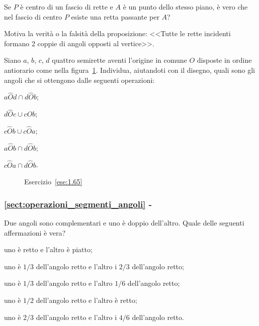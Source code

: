 \begin{esercizio}
\label{ese:1.63}
Se \(P\) è centro di un fascio di rette e \(A\) è un punto dello stesso 
piano, è vero che nel fascio di centro \(P\) esiste una retta passante 
per \(A\)?
\end{esercizio}

\begin{esercizio}
\label{ese:1.64}
Motiva la verità o la falsità della proposizione: <<Tutte le rette 
incidenti formano 2 coppie di angoli opposti al vertice>>.
\end{esercizio}

\begin{esercizio}
\label{ese:1.65}
Siano \(a\), \(b\), \(c\), \(d\) quattro semirette aventi l'origine in comune 
\(O\) disposte in ordine antiorario come nella 
figura~\ref{fig:ese1.65}. Individua, aiutandoti con il disegno, quali 
sono gli angoli che si ottengono dalle seguenti operazioni:
\begin{multicols}{3}
\begin{enumeratea}
\item \(a\widehat{O}d \cap d\widehat{O}b\);
\item \(d\widehat{O}c \cup c\widehat{O}b\);
\item \(c\widehat{O}b \cup c\widehat{O}a\);
\item \(a\widehat{O}b \cap d\widehat{O}b\);
\item \(c\widehat{O}a \cap d\widehat{O}b\).
\end{enumeratea}
\end{multicols}
\end{esercizio}


\begin{inaccessibleblock}
 \begin{figure}[htb]
 \centering
 \caption{Esercizio~\ref{ese:1.65}}\label{fig:ese1.65}
\end{figure}
\end{inaccessibleblock}

\begingroup
\hypersetup{linkcolor=black}
\subsubsection*{\ref{sect:operazioni_segmenti_angoli} - 
}
\endgroup

\begin{esercizio}
\label{ese:1.66}
Due angoli sono complementari e uno è doppio dell'altro. Quale delle 
seguenti affermazioni è vera?
\begin{enumeratea}
\item uno è retto e l'altro è piatto;
\item uno è \(1/3\) dell'angolo retto e l'altro i \(2/3\) dell'angolo 
retto;
\item uno è \(1/3\) dell'angolo retto e l'altro \(1/6\) dell'angolo retto;
\item uno è \(1/2\) dell'angolo retto e l'altro è retto;
\item uno è \(2/3\) dell'angolo retto e l'altro i \(4/6\) dell'angolo 
retto.
\end{enumeratea}
\end{esercizio}

